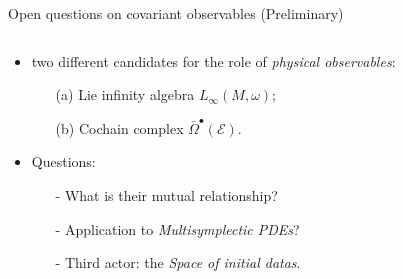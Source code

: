 \documentclass[handout,10pt]{beamer}
\begin{document}
\begin{frame}{Open questions on covariant observables (Preliminary)}
\begin{columns}
\begin{column}{.50\linewidth}
\begin{itemize}
\begin{itemize}
					\end{itemize}
				\item<3-> two different candidates for the role of \emph{physical observables}:
					\begin{itemize}
						\item[(a)] Lie infinity algebra $L_\infty (M,\omega)$;
						\item[(b)] Cochain complex $\bar{\Omega}^\bullet(\mathcal{E})$.
					\end{itemize}
				\item<4-> Questions:
					\begin{itemize}
						\item[-] What is their mutual relationship?
						\item[-] Application to \emph{Multisymplectic PDEs}?
						\item[-] Third actor: the \emph{Space of initial datas}.
					\end{itemize}																		
			\end{itemize}
		\end{column}
	\end{columns}
\end{frame}


\end{document}
